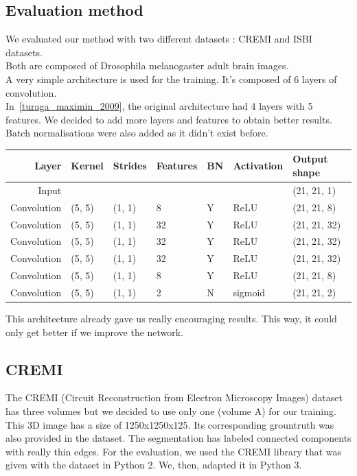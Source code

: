 \subsection{Evaluation method}
We evaluated our method with two different datasets : CREMI and ISBI datasets.\\
Both are composed of Drosophila melanogaster adult brain images.\\

A very simple architecture is used for the training.
It's composed of 6 layers of convolution.\\
In~\ref{turaga_maximin_2009}, the original architecture had 4 layers with 5 features. We decided to add more layers and features to obtain better results. 
Batch normalisations were also added as it didn't exist before.\\

\begin{center}
	\begin{tabular}{rllllll}\toprule
		Layer & Kernel & Strides & Features & BN &  Activation & Output shape \\
		\midrule
		Input  &  &  & & & & (21, 21, 1)  \\
		Convolution & (5, 5) & (1, 1) & 8 & Y & ReLU  & (21, 21, 8)  \\
		Convolution & (5, 5) & (1, 1) & 32 & Y & ReLU  & (21, 21, 32)  \\
		Convolution & (5, 5) & (1, 1) & 32 & Y & ReLU  & (21, 21, 32)  \\
		Convolution & (5, 5) & (1, 1) & 32 & Y & ReLU  & (21, 21, 32)  \\
		Convolution & (5, 5) & (1, 1) & 8 & Y & ReLU  & (21, 21, 8)  \\
		Convolution & (5, 5) & (1, 1) & 2 & N & sigmoid  & (21, 21, 2)  \\
		\bottomrule
	\end{tabular}
\end{center}

This architecture already gave us really encouraging results. This way, it could only get better if we improve the network.\\


\subsection{CREMI}
The CREMI (Circuit Reconstruction from Electron Microscopy Images) dataset has three volumes but we decided to use only one (volume A) for our training.\\
This 3D image has a size of 1250x1250x125. Its corresponding grountruth was also provided in the dataset. 
The segmentation has labeled connected components with really thin edges.
For the evaluation, we used the CREMI library that was given with the dataset in Python 2. We, then, adapted it in Python 3.\\

